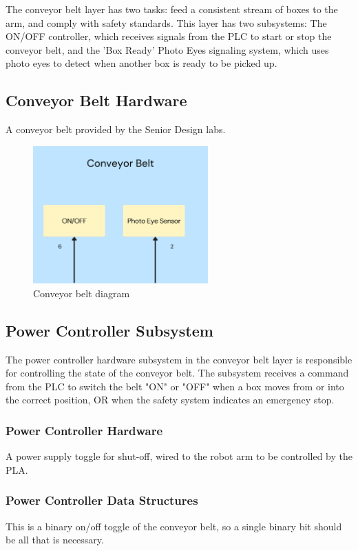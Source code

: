 The conveyor belt layer has two tasks: feed a consistent stream of boxes to the arm, and comply with safety standards. This layer has two subsystems: The ON/OFF controller, which receives signals from the PLC to start or stop the conveyor belt, and the 'Box Ready' Photo Eyes signaling system, which uses photo eyes to detect when another box is ready to be picked up.

\subsection{Conveyor Belt Hardware}
A conveyor belt provided by the Senior Design labs. 

\begin{figure}[h!]
\centering
 \includegraphics[width=0.60\textwidth]{images/conveyor.png}
 \caption{Conveyor belt diagram}
\end{figure}

\subsection{Power Controller Subsystem}
The power controller hardware subsystem in the conveyor belt layer is responsible for controlling the state of the conveyor belt. The subsystem receives a command from the PLC to switch the belt "ON" or "OFF" when a box moves from or into the correct position, OR when the safety system indicates an emergency stop.

\subsubsection{Power Controller Hardware}
A power supply toggle for shut-off, wired to the robot arm to be controlled by the PLA.

\subsubsection{Power Controller Data Structures}
This is a binary on/off toggle of the conveyor belt, so a single binary bit should be all that is necessary.

